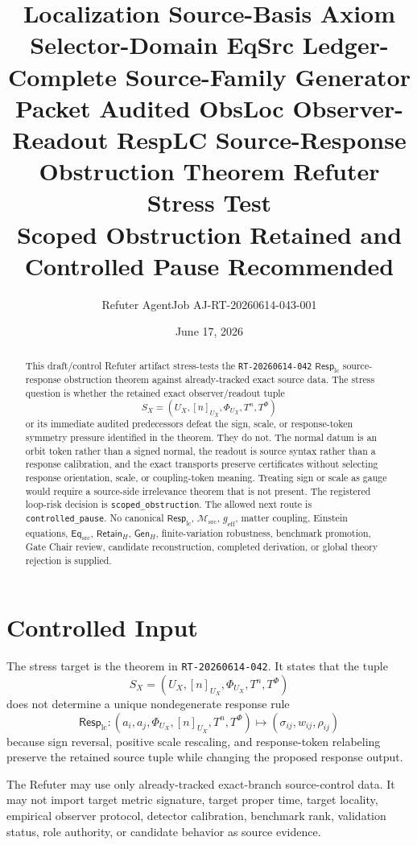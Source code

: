 \documentclass[11pt]{article}
\title{\textbf{Localization Source-Basis Axiom Selector-Domain EqSrc Ledger-Complete Source-Family Generator Packet Audited ObsLoc Observer-Readout RespLC Source-Response Obstruction Theorem Refuter Stress Test}\\[0.35em]
\large Scoped Obstruction Retained and Controlled Pause Recommended}
\author{Refuter AgentJob AJ-RT-20260614-043-001}
\date{June 17, 2026}
\newcommand{\EqSrc}{\mathsf{Eq}_{\mathrm{src}}}
\newcommand{\RetainH}{\mathsf{Retain}_{H}}
\newcommand{\GenH}{\mathsf{Gen}_{H}}
\newcommand{\Msrc}{\mathcal{M}_{\mathrm{src}}}
\newcommand{\RespLC}{\mathsf{Resp}_{\mathrm{lc}}}
\newcommand{\geff}{g_{\mathrm{eff}}}
\begin{document}
\maketitle

\begin{abstract}
This draft/control Refuter artifact stress-tests the
\texttt{RT-20260614-042} \(\RespLC\) source-response obstruction
theorem against already-tracked exact source data. The stress question
is whether the retained exact observer/readout tuple
\[
    S_X=(U_X,[n]_{U_X},\Phi_{U_X},T^n,T^\Phi)
\]
or its immediate audited predecessors defeat the sign, scale, or
response-token symmetry pressure identified in the theorem. They do
not. The normal datum is an orbit token rather than a signed normal,
the readout is source syntax rather than a response calibration, and
the exact transports preserve certificates without selecting response
orientation, scale, or coupling-token meaning. Treating sign or scale
as gauge would require a source-side irrelevance theorem that is not
present. The registered loop-risk decision is
\texttt{scoped\_obstruction}. The allowed next route is
\texttt{controlled\_pause}. No canonical \(\RespLC\), \(\Msrc\),
\(\geff\), matter coupling, Einstein equations, \(\EqSrc\),
\(\RetainH\), \(\GenH\), finite-variation robustness, benchmark
promotion, Gate Chair review, candidate reconstruction, completed
derivation, or global theory rejection is supplied.
\end{abstract}

\section{Controlled Input}

The stress target is the theorem in
\texttt{RT-20260614-042}. It states that the tuple
\[
    S_X=(U_X,[n]_{U_X},\Phi_{U_X},T^n,T^\Phi)
\]
does not determine a unique nondegenerate response rule
\[
    \RespLC:
    (a_i,a_j,\Phi_{U_X},[n]_{U_X},T^n,T^\Phi)
    \longmapsto
    (\sigma_{ij},w_{ij},\rho_{ij})
\]
because sign reversal, positive scale rescaling, and response-token
relabeling preserve the retained source tuple while changing the
proposed response output.

The Refuter may use only already-tracked exact-branch source-control
data. It may not import target metric signature, target proper time,
target locality, empirical observer protocol, detector calibration,
benchmark rank, validation status, role authority, or candidate
behavior as source evidence.
\end{document}
